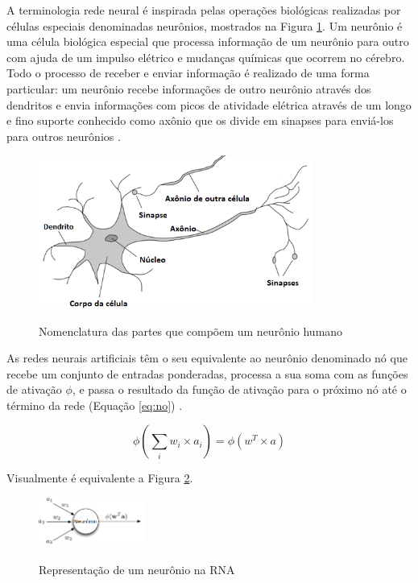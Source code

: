 A terminologia rede neural é inspirada pelas operações biológicas realizadas por células especiais denominadas neurônios, mostrados na Figura \ref{fig:celula}. Um neurônio é uma célula biológica especial que processa informação de um neurônio para outro com ajuda de um impulso elétrico e mudanças químicas que ocorrem no cérebro. Todo o processo de receber e enviar informação é realizado de uma forma particular: um neurônio recebe informações de outro neurônio através dos dendritos e envia informações com picos de atividade elétrica através de um longo e fino suporte conhecido como axônio que os divide em sinapses para enviá-los para outros neurônios \cite{ai}.

\begin{figure}[h]
    \caption{Nomenclatura das partes que compõem um neurônio humano}
    \centering
    \includegraphics[width=0.8\textwidth]{Textuais/Figuras/celula.png}
    \label{fig:celula}
\end{figure}

As redes neurais artificiais têm o seu equivalente ao neurônio denominado nó que recebe um conjunto de entradas ponderadas, processa a sua soma com as funções de ativação $\phi$, e passa o resultado da função de ativação para o próximo nó até o término da rede (Equação \ref{eq:no}) \cite{ann}.

\begin{equation}
\label{eq:no}
    \phi \left( \sum_{i} w_i\times a_i \right) = \phi(w^T\times a)
\end{equation}

Visualmente é equivalente a Figura \ref{fig:neuronio-rna}.

\begin{figure}[h]
    \caption{Representação de um neurônio na RNA}
    \centering
    \includegraphics[width=0.31\textwidth]{Textuais/Figuras/rep-neronio.png}
    \label{fig:neuronio-rna}
\end{figure}

